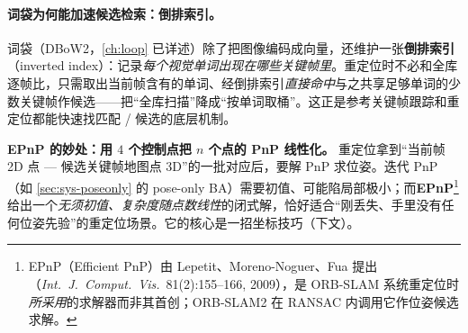 \paragraph{词袋为何能加速候选检索：倒排索引。}
词袋（DBoW2\cite{galvez2012bags}，\cref{ch:loop} 已详述）除了把图像编码成向量，还维护一张\textbf{倒排索引}（inverted index）：记录\emph{每个视觉单词出现在哪些关键帧里}。重定位时不必和全库逐帧比，只需取出当前帧含有的单词、经倒排索引\emph{直接命中}与之共享足够单词的少数关键帧作候选——把“全库扫描”降成“按单词取桶”。这正是参考关键帧跟踪和重定位都能快速找匹配 / 候选的底层机制。

\begin{insight}
\textbf{EPnP 的妙处：用 $4$ 个控制点把 $n$ 个点的 PnP 线性化。}
重定位拿到“当前帧 2D 点 — 候选关键帧地图点 3D”的一批对应后，要解 PnP 求位姿。迭代 PnP（如 \cref{sec:sys-poseonly} 的 pose-only BA）需要初值、可能陷局部极小；而\textbf{EPnP}\footnote{EPnP（Efficient PnP）由 Lepetit、Moreno-Noguer、Fua 提出（\emph{Int.\ J.\ Comput.\ Vis.}\ 81(2):155--166, 2009），是 ORB-SLAM 系统重定位时\emph{所采用}的求解器而非其首创；ORB-SLAM2\cite{murartal2017orbslam2} 在 RANSAC 内调用它作位姿候选求解。}给出一个\emph{无须初值、复杂度随点数线性}的闭式解，恰好适合“刚丢失、手里没有任何位姿先验”的重定位场景。它的核心是一招坐标技巧（下文）。
\end{insight}


